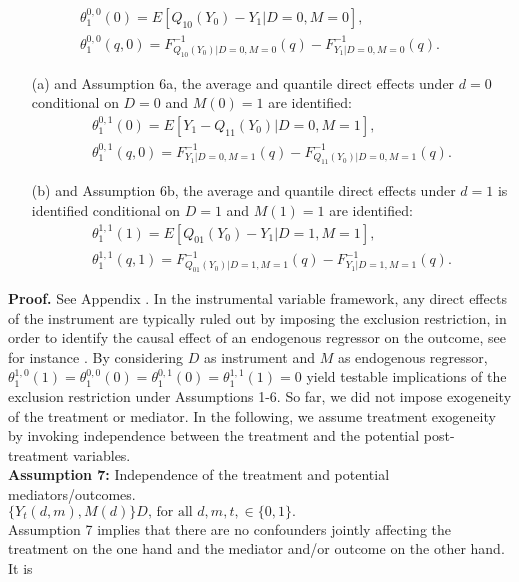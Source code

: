 \documentclass[a4paper,12pt]{article}
\begin{document}
 \doublespacing \pagestyle{plain}
\begin{align*}
\theta_1^{0,0}(0)= E[Q_{10}(Y_0)-Y_1|D=0,M=0], \\
\theta_1^{0,0}(q,0)= F_{Q_{10}(Y_0)|D=0,M=0}^{-1}(q)-F_{Y_1|D=0,M=0}^{-1}(q).
\end{align*}
\begin{itemize}
\item[(a)] and Assumption 6a, the average and quantile direct effects under $d=0$ conditional on $D=0$ and $M(0)=1$ are identified:
\begin{align*}
\theta_1^{0,1}(0)= E[Y_1-Q_{11}(Y_0)|D=0,M=1],\\
\theta_1^{0,1}(q,0)= F_{Y_1|D=0,M=1}^{-1}(q)-F_{Q_{11}(Y_0)|D=0,M=1}^{-1}(q).
\end{align*}
\item[(b)] and Assumption 6b, the average and quantile direct effects under $d=1$ is identified conditional on $D=1$ and $M(1)=1$ are identified:
\begin{align*}
\theta_1^{1,1}(1)= E[Q_{01}(Y_0)-Y_1|D=1,M=1],\\
\theta_1^{1,1}(q,1)= F_{Q_{01}(Y_0)|D=1,M=1}^{-1}(q)-F_{Y_1|D=1,M=1}^{-1}(q).
\end{align*}
\end{itemize}
\textbf{Proof.} See Appendix .
In the instrumental variable framework, any direct effects of the instrument are typically ruled out by imposing the exclusion restriction, in order to identify the causal effect of an endogenous regressor on the outcome, see for instance . By considering $D$ as instrument and $M$ as endogenous regressor, $\theta_1^{1,0}(1)=\theta_1^{0,0}(0)=\theta_1^{0,1}(0)=\theta_1^{1,1}(1)=0$ yield testable implications of the exclusion restriction under Assumptions 1-6.
So far, we did not impose exogeneity of the treatment or mediator. In the following, we assume treatment exogeneity by invoking independence between the treatment and the potential post-treatment variables.\vspace{5 pt}\\
\textbf{Assumption 7:} Independence of the treatment and potential mediators/outcomes.\\
$ \{Y_t(d,m),M(d)\} D \mbox{, for all } d,m,t, \in \{0,1\}.$\vspace{5 pt}\\
Assumption 7 implies that there are no confounders jointly affecting the treatment on the one hand and the mediator and/or outcome on the other hand. It is
\end{document}
